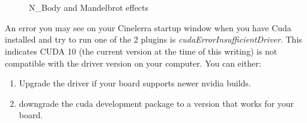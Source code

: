 \begin{figure}[htpb]
	\centering
	\begin{minipage}[h]{0.99\linewidth}
		 \\
	\end{minipage}
	\vfill
	\begin{minipage}[h]{0.7\linewidth}
		 \\
	\end{minipage}
	\caption{N\_Body and Mandelbrot effects}
	\label{fig:cuda-effects}
\end{figure}

An error you may see on your Cinelerra startup window when you have Cuda installed and try to run one of the 2 plugins is \textit{cudaErrorInsufficientDriver}.  This indicates CUDA 10 (the current version at the time of this writing) is not compatible with the driver version on your computer.  You can either:

\begin{enumerate}
	\item Upgrade the driver if your board supports newer nvidia builds.
	\item downgrade the cuda development package to a version that works for your board.
\end{enumerate}

